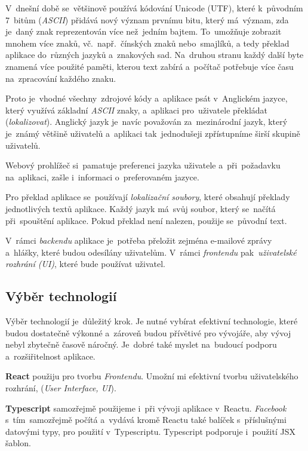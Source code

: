 \documentclass[10pt,a4paper]{article}
\begin{document}
            V~dnešní době se~většinově používá kódování Unicode (UTF), které k~původním 7~bitům (\emph{ASCII}) přidává nový význam prvnímu bitu, který má~význam, zda je~daný znak reprezentován více než~jedním bajtem. To~umožňuje zobrazit mnohem více znaků, vč.~např.~čínských znaků nebo~smajlíků, a tedy překlad aplikace do~různých jazyků a~znakových sad. Na~druhou stranu každý další byte znamená více použité paměti, kterou text zabírá a~počítač potřebuje více času na~zpracování každého znaku.
            
            Proto je~vhodné všechny~zdrojové kódy a~aplikace psát v~Anglickém jazyce, který využívá základní \emph{ASCII} znaky, a~aplikaci pro~uživatele překládat (\emph{lokalizovat}). Anglický jazyk je~navíc považován za~mezinárodní jazyk, který je~známý většině uživatelů a~aplikaci tak~jednodušeji zpřístupníme širší skupině uživatelů.
            
            Webový prohlížeč si~pamatuje preferenci jazyka uživatele a~při~požadavku na~aplikaci, zašle i~informaci o~preferovaném jazyce.

            Pro překlad aplikace se~používají \emph{lokalizační soubory}, které obsahují překlady jednotlivých textů aplikace. Každý jazyk má~svůj soubor, který se~načítá při~spouštění aplikace. Pokud překlad není nalezen, použije se~původní text.

            V~rámci \emph{backendu} aplikace je~potřeba přeložit zejména e-mailové zprávy a~hlášky, které budou odesílány uživatelům. V~rámci \emph{frontendu} pak~\emph{uživatelské rozhrání (UI)}, které bude používat uživatel.

        \subsection{Výběr technologií}
            Výběr technologií je~důležitý krok. Je nutné vybírat efektivní technologie, které budou dostatečně výkonné a~zároveň budou přívětivé pro vývojáře, aby vývoj nebyl zbytečně časově náročný. Je~dobré také myslet na~budoucí podporu a~rozšiřitelnost aplikace.

            \textbf{React} použiju pro tvorbu \emph{Frontendu}. Umožní mi efektivní tvorbu uživatelského rozhrání, (\emph{User Interface, UI}).

            \textbf{Typescript} samozřejmě použijeme i~při vývoji aplikace v~Reactu. \emph{Facebook} s~tím~samozřejmě počítá a~vydává
            kromě Reactu také balíček s~příslušnými datovými typy, pro použití v~Typescriptu. Typescript podporuje i~použití JSX šablon. \cite[Refeerence/Handbook/JSX]{TypeScript}
\end{document}
